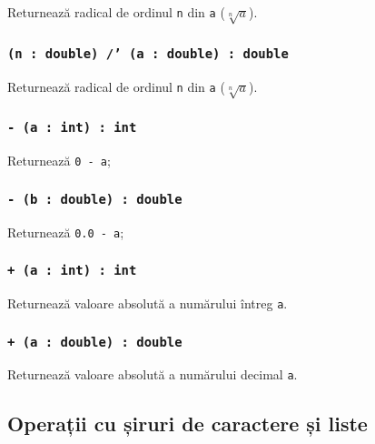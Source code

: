 Returnează radical de ordinul \texttt{n} din \texttt{a} ($\sqrt[n]{a}$).

\subsubsection{\texttt{(n : double) /' (a : double) : double}}

Returnează radical de ordinul \texttt{n} din \texttt{a} ($\sqrt[n]{a}$).


\subsubsection{\texttt{- (a : int) : int}}

Returnează \texttt{0 - a};

\subsubsection{\texttt{- (b : double) : double}}

Returnează \texttt{0.0 - a};

\subsubsection{\texttt{+ (a : int) : int}}

Returnează valoare absolută a numărului întreg \texttt{a}.

\subsubsection{\texttt{+ (a : double) : double}}

Returnează valoare absolută a numărului decimal \texttt{a}.

\subsection{Operații cu șiruri de caractere și liste}

